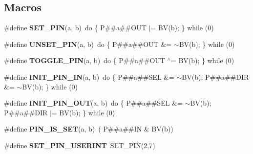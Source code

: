 \subsection*{Macros}
\begin{DoxyCompactItemize}
\item 
\hypertarget{group__chaos__internal_ga06ff8df2351884e681feb85cda3b7045}{\#define {\bfseries S\-E\-T\-\_\-\-P\-I\-N}(a, b)~do \{ P\#\#a\#\#O\-U\-T $|$=  B\-V(b); \} while (0)}\label{group__chaos__internal_ga06ff8df2351884e681feb85cda3b7045}

\item 
\hypertarget{group__chaos__internal_gad41c97f646b9e37f6c4f967910b5f012}{\#define {\bfseries U\-N\-S\-E\-T\-\_\-\-P\-I\-N}(a, b)~do \{ P\#\#a\#\#O\-U\-T \&= $\sim$B\-V(b); \} while (0)}\label{group__chaos__internal_gad41c97f646b9e37f6c4f967910b5f012}

\item 
\hypertarget{group__chaos__internal_gaa45796bc706ece2f2f96bda54df162f8}{\#define {\bfseries T\-O\-G\-G\-L\-E\-\_\-\-P\-I\-N}(a, b)~do \{ P\#\#a\#\#O\-U\-T $^\wedge$=  B\-V(b); \} while (0)}\label{group__chaos__internal_gaa45796bc706ece2f2f96bda54df162f8}

\item 
\hypertarget{group__chaos__internal_ga11177cf033a258d640e767fc09e10fdb}{\#define {\bfseries I\-N\-I\-T\-\_\-\-P\-I\-N\-\_\-\-I\-N}(a, b)~do \{ P\#\#a\#\#S\-E\-L \&= $\sim$B\-V(b); P\#\#a\#\#D\-I\-R \&= $\sim$B\-V(b); \} while (0)}\label{group__chaos__internal_ga11177cf033a258d640e767fc09e10fdb}

\item 
\hypertarget{group__chaos__internal_gaf542b15cf4ab5aab9a6e39fc40e09f13}{\#define {\bfseries I\-N\-I\-T\-\_\-\-P\-I\-N\-\_\-\-O\-U\-T}(a, b)~do \{ P\#\#a\#\#S\-E\-L \&= $\sim$B\-V(b); P\#\#a\#\#D\-I\-R $|$=  B\-V(b); \} while (0)}\label{group__chaos__internal_gaf542b15cf4ab5aab9a6e39fc40e09f13}

\item 
\hypertarget{group__chaos__internal_gad446a170ca0e9f0f3f57e24e3199a406}{\#define {\bfseries P\-I\-N\-\_\-\-I\-S\-\_\-\-S\-E\-T}(a, b)~(    P\#\#a\#\#I\-N  \&   B\-V(b))}\label{group__chaos__internal_gad446a170ca0e9f0f3f57e24e3199a406}

\item 
\hypertarget{group__chaos__internal_gad8148e4e191d853cd938b5f5db7770c9}{\#define {\bfseries S\-E\-T\-\_\-\-P\-I\-N\-\_\-\-U\-S\-E\-R\-I\-N\-T}~S\-E\-T\-\_\-\-P\-I\-N(2,7)}\label{group__chaos__internal_gad8148e4e191d853cd938b5f5db7770c9}


\end{DoxyCompactItemize}
